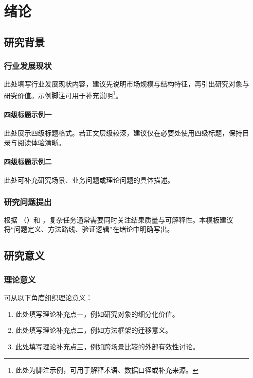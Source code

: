 \documentclass[UTF8,AutoFakeBold=1,AutoFakeSlant,zihao=-4]{SCAU}
\begin{document}
\section{绪论}

\subsection{研究背景}

\subsubsection{行业发展现状}
此处填写行业发展现状内容，建议先说明市场规模与结构特征，再引出研究对象与研究价值。示例脚注可用于补充说明\footnote{此处为脚注示例，可用于解释术语、数据口径或补充来源。}。

\paragraph{四级标题示例一}
此处展示四级标题格式。若正文层级较深，建议仅在必要处使用四级标题，保持目录与阅读体验清晰。

\paragraph{四级标题示例二}
此处可补充研究场景、业务问题或理论问题的具体描述。

\subsubsection{研究问题提出}
根据 \citeauthor{smith2022deep}（\citeyear{smith2022deep}）和 \cite{chen2023neural}，复杂任务通常需要同时关注结果质量与可解释性。本模板建议将“问题定义、方法路线、验证逻辑”在绪论中明确写出。

\subsection{研究意义}

\subsubsection{理论意义}
可从以下角度组织理论意义：
\begin{enumerate}
  \item 此处填写理论补充点一，例如研究对象的细分化价值。
  \item 此处填写理论补充点二，例如方法框架的迁移意义。
  \item 此处填写理论补充点三，例如跨场景比较的外部有效性讨论。
\end{enumerate}
\end{document}
